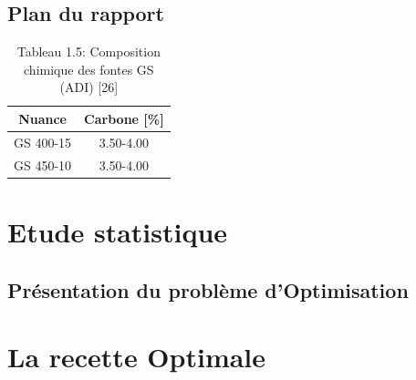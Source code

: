 \documentclass[12pt]{article}
\begin{document}





\subsection{Plan du rapport }

\begin{table}[H]
    \caption{Tableau 1.5: Composition chimique des fontes GS (ADI) [26]}
    \centering
        \begin{tabular}{|c|c|}
        \hline
        Nuance & Carbone [\%] \\ \hline
        GS 400-15 & 3.50-4.00  \\ \hline
        GS 450-10 & 3.50-4.00  \\ \hline
        \end{tabular}
\end{table}
    
    


\section{Etude statistique }

\subsection{Présentation du problème d'Optimisation }



\section{La recette Optimale}
\end{document}
